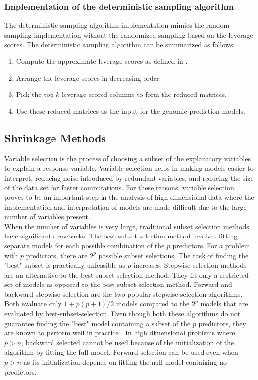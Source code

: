 \subsubsection{Implementation of the deterministic sampling algorithm}

The deterministic sampling algorithm implementation mimics the random sampling implementation without the randomized sampling based on the leverage scores. The deterministic sampling algorithm can be summarized as follows:

\begin{enumerate}
    \item Compute the approximate leverage scores as defined in \cite{drineas_fast_2012}.
    \item Arrange the leverage scores in decreasing order. 
    \item Pick the top $k$ leverage scored columns to form the reduced matrices.
    \item Use these reduced matrices as the input for the genomic prediction models. 
\end{enumerate}


\subsection{Shrinkage Methods}
\label{sec:shrinkage methods}
Variable selection is the process of choosing a subset of the explanatory variables to explain a response variable. Variable selection helps in making models easier to interpret, reducing noise introduced by redundant variables, and reducing the size of the data set for faster computations. For these reasons, variable selection proves to be an important step in the analysis of high-dimensional data where the implementation and interpretation of models are made difficult due to the large number of variables present. \\


When the number of variables is very large, traditional subset selection methods have significant drawbacks. The best subset selection method involves fitting separate models for each possible combination of the $p$ predictors. For a problem with $p$ predictors, there are $2^p$ possible subset selections. The task of finding the "best" subset is practically unfeasible as $p$ increases. Stepwise selection methods are an alternative to the best-subset-selection method. They fit only a restricted set of models as opposed to the best-subset-selection method. Forward and backward stepwise selection are the two popular stepwise  selection algorithms. Both evaluate only $1+p(p+1)/2$ models compared to the $2^p$ models that are evaluated by best-subset-selection. Even though both these algorithms do not guarantee finding the "best" model containing a subset of the $p$ predictors, they are known to perform well in practice \cite{james_introduction_2013}. In high dimensional problems where $p > n$, backward selected cannot be used because of the initialization of the algorithm by fitting the full model. Forward selection can be used even when $ p > n$ as its initialization depends on fitting the null model containing no predictors. \\

